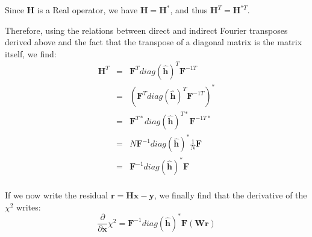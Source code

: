 \documentclass[12pt]{article}
\newcommand{\psf}{\mathbf{H}}
\newcommand{\hhat}{\mathbf{\hat h}}
\newcommand{\x}{\mathbf{x}}
\newcommand{\y}{\mathbf{y}}
\newcommand{\rvect}{\mathbf{r}}
\newcommand{\W}{\mathbf{W}}
\newcommand{\F}{\mathbf{F}}
\newcommand{\ddx}{\frac{\partial}{\partial \mathbf{x}}}
\begin{document}
Since $\psf$ is a Real operator, we have $\psf = \psf^{*}$, and thus $\psf^{T} =
\psf^{*T}$.

Therefore, using the relations between direct and indirect Fourier transposes
derived above and the fact that the transpose of a diagonal matrix is the matrix
itself, we find:
\begin{eqnarray*}
  \label{eq:12}
  \psf^{T} & = & \F^{T} diag(\hhat)^{T} \F^{-1T}\\
           & = & (\F^{T} diag(\hhat)^{T} \F^{-1T})^{*}\\
           & = & \F^{T*} diag(\hhat)^{T*} \F^{-1T*}\\
           & = & N\F^{-1} diag(\hhat)^{*} \frac{1}{N}\F\\
           & = & \F^{-1} diag(\hhat)^{*} \F\\
\end{eqnarray*}

If we now write the residual $\rvect = \psf \x - \y$, we finally find that the
derivative of the $\chi^{2}$ writes:
\begin{equation}
  \label{eq:13}
  \ddx \chi^{2} = \F^{-1} diag(\hhat)^{*} \F(\W \mathbf{\rvect}) 
\end{equation}
\end{document}
